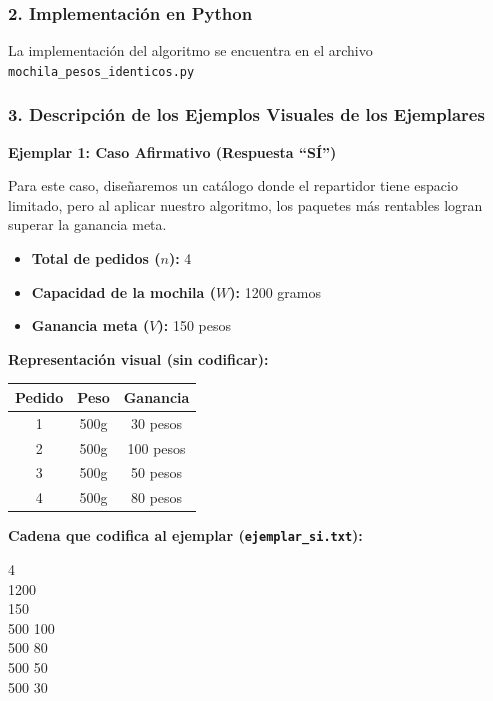 \subsubsection*{2. Implementación en Python}
La implementación del algoritmo se encuentra en el archivo \texttt{mochila\_pesos\_identicos.py}


\subsubsection*{3. Descripción de los Ejemplos Visuales de los Ejemplares}
\textbf{Ejemplar 1: Caso Afirmativo (Respuesta ``SÍ'')}

Para este caso, diseñaremos un catálogo donde el repartidor tiene espacio limitado, pero al aplicar nuestro algoritmo, los paquetes más rentables logran superar la ganancia meta.

\begin{itemize}[leftmargin=*]
    \item \textbf{Total de pedidos ($n$):} 4
    \item \textbf{Capacidad de la mochila ($W$):} 1200 gramos
    \item \textbf{Ganancia meta ($V$):} 150 pesos
\end{itemize}

\textbf{Representación visual (sin codificar):}
\begin{center}
\renewcommand{\arraystretch}{1.2}
\begin{tabular}{ccc}
\toprule
\textbf{Pedido} & \textbf{Peso} & \textbf{Ganancia} \\
\midrule
1 & 500g & 30 pesos \\
2 & 500g & 100 pesos \\
3 & 500g & 50 pesos \\
4 & 500g & 80 pesos \\
\bottomrule
\end{tabular}
\end{center}

\textbf{Cadena que codifica al ejemplar (\texttt{ejemplar\_si.txt}):}
\begin{center}
\begin{terminal}
4\\
1200\\
150\\
500 100\\
500 80\\
500 50\\
500 30
\end{terminal}
\end{center}

